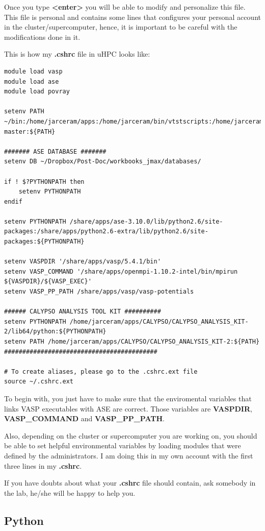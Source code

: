 \documentclass[11pt]{article}
\begin{document}
Once you type \textbf{<enter>} you will be able to modify and personalize this file. This file is personal and contains some lines that configures your personal account in the cluster/supercomputer, hence, it is important to be careful with the modifications done in it.

This is how my \textbf{.cshrc} file in uHPC looks like:
\begin{verbatim}
module load vasp
module load ase
module load povray

setenv PATH ~/bin:/home/jarceram/apps:/home/jarceram/bin/vtstscripts:/home/jarceram/bin/web_scripts:/home/jarceram/apps/VASP-master:${PATH}

####### ASE DATABASE #######
setenv DB ~/Dropbox/Post-Doc/workbooks_jmax/databases/

if ! $?PYTHONPATH then
    setenv PYTHONPATH
endif

setenv PYTHONPATH /share/apps/ase-3.10.0/lib/python2.6/site-packages:/share/apps/python2.6-extra/lib/python2.6/site-packages:${PYTHONPATH}

setenv VASPDIR '/share/apps/vasp/5.4.1/bin'
setenv VASP_COMMAND '/share/apps/openmpi-1.10.2-intel/bin/mpirun ${VASPDIR}/${VASP_EXEC}'
setenv VASP_PP_PATH /share/apps/vasp/vasp-potentials

###### CALYPSO ANALYSIS TOOL KIT ##########
setenv PYTHONPATH /home/jarceram/apps/CALYPSO/CALYPSO_ANALYSIS_KIT-2/lib64/python:${PYTHONPATH}
setenv PATH /home/jarceram/apps/CALYPSO/CALYPSO_ANALYSIS_KIT-2:${PATH}
##########################################

# To create aliases, please go to the .cshrc.ext file
source ~/.cshrc.ext
\end{verbatim}

To begin with, you just have to make sure that the enviromental variables that links VASP executables with ASE are correct. Those variables are \textbf{VASPDIR}, \textbf{VASP\_COMMAND} and \textbf{VASP\_PP\_PATH}.

Also, depending on the cluster or supercomputer you are working on, you should be able to set helpful environmental variables by loading modules that were defined by the administrators. I am doing this in my own account with the first three lines in my \textbf{.cshrc}.

If you have doubts about what your \textbf{.cshrc}  file should contain, ask somebody in the lab, he/she will be happy to help you.
\subsection{Python}
\label{sec-2-2}
\end{document}
